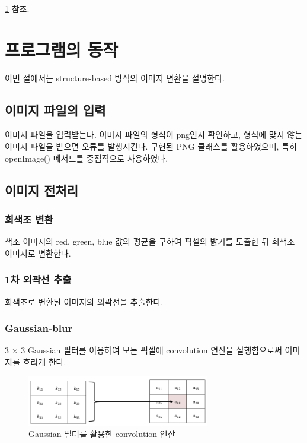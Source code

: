 \documentclass[conference]{IEEEtran}
\begin{document}
\subsubsection{\structure} \ref{sec3} 참조.

\section{프로그램의 동작} \label{sec3}

이번 절에서는 structure-based 방식의 이미지 변환을 설명한다.

\subsection{이미지 파일의 입력}

이미지 파일을 입력받는다. 이미지 파일의 형식이 png인지 확인하고, 형식에 맞지 않는 이미지 파일을 받으면 오류를 발생시킨다.
 구현된 PNG 클래스를 활용하였으며, 특히 openImage() 메서드를 중점적으로 사용하였다.

\subsection{이미지 전처리}

\subsubsection{회색조 변환}

색조 이미지의 red, green, blue 값의 평균을 구하여 픽셀의 밝기를 도출한 뒤 회색조 이미지로 변환한다.

\subsubsection{1차 외곽선 추출}

회색조로 변환된 이미지의 외곽선을 추출한다.

\subsubsection{Gaussian-blur}

3 $ \times $ 3 Gaussian 필터를 이용하여 모든 픽셀에 convolution 연산을 실행함으로써 이미지를 흐리게 한다.

\begin{figure}[H]
    \centering
    \includegraphics[width=8cm]{Convolution.png}
    \caption{Gaussian 필터를 활용한 convolution 연산}
\end{figure}
\end{document}
